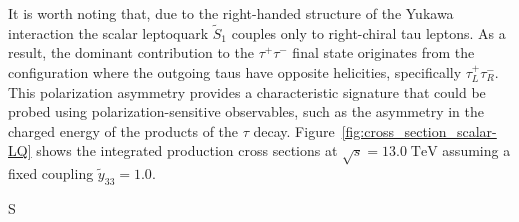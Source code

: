 It is worth noting that, due to the right-handed structure of the Yukawa interaction the scalar leptoquark $\tilde{S}_1$ couples only to right-chiral tau leptons. As a result, the dominant contribution to the $\tau^+\tau^-$ final state originates from the configuration where the outgoing taus have opposite helicities, specifically $\tau^+_L \tau^-_R$. This polarization asymmetry provides a characteristic signature that could be probed using polarization-sensitive observables, such as the asymmetry in the charged energy of the products of the $\tau$ decay. Figure~\ref{fig:cross_section_scalar-LQ} shows the integrated production cross sections at $\sqrt{s} = 13.0\; \si{\tera\electronvolt}$ assuming a fixed coupling $\tilde{y}_{33} = 1.0$.

S%



